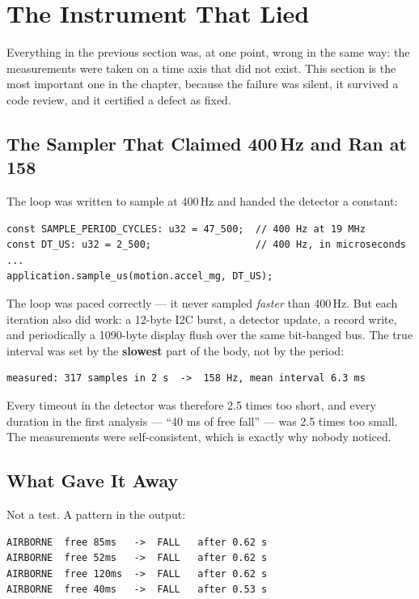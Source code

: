 \section{The Instrument That Lied}
\label{sec:instrument-lied}

Everything in the previous section was, at one point, wrong in the same way: the measurements
were taken on a time axis that did not exist. This section is the most important one in the
chapter, because the failure was silent, it survived a code review, and it certified a defect
as fixed.

\subsection{The Sampler That Claimed 400\,Hz and Ran at 158}

The loop was written to sample at 400\,Hz and handed the detector a constant:

\begin{verbatim}
const SAMPLE_PERIOD_CYCLES: u32 = 47_500;  // 400 Hz at 19 MHz
const DT_US: u32 = 2_500;                  // 400 Hz, in microseconds
...
application.sample_us(motion.accel_mg, DT_US);
\end{verbatim}

The loop was paced correctly — it never sampled \emph{faster} than 400\,Hz. But each iteration
also did work: a 12-byte I2C burst, a detector update, a record write, and periodically a
1090-byte display flush over the same bit-banged bus. The true interval was set by the
\textbf{slowest} part of the body, not by the period:

\begin{verbatim}
measured: 317 samples in 2 s  ->  158 Hz, mean interval 6.3 ms
\end{verbatim}

Every timeout in the detector was therefore 2.5 times too short, and every duration in the
first analysis — ``40 ms of free fall'' — was 2.5 times too small. The measurements were
self-consistent, which is exactly why nobody noticed.

\subsection{What Gave It Away}

Not a test. A pattern in the output:

\begin{verbatim}
AIRBORNE  free 85ms   ->  FALL   after 0.62 s
AIRBORNE  free 52ms   ->  FALL   after 0.62 s
AIRBORNE  free 120ms  ->  FALL   after 0.62 s
AIRBORNE  free 40ms   ->  FALL   after 0.53 s
\end{verbatim}

